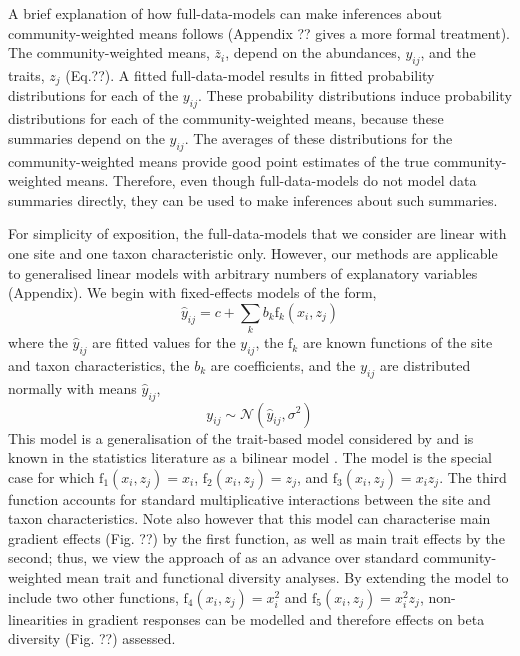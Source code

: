 \documentclass[12pt]{ecology}
\begin{document}
A brief explanation of how full-data-models can make inferences about community-weighted means follows (Appendix ?? gives a more formal treatment).  The community-weighted means, $\bar{z}_i$, depend on the abundances, $y_{ij}$, and the traits, $z_j$ (Eq.??).  A fitted full-data-model results in fitted probability distributions for each of the $y_{ij}$.  These probability distributions induce probability distributions for each of the community-weighted means, because these summaries depend on the $y_{ij}$.  The averages of these distributions for the community-weighted means provide good point estimates of the true community-weighted means.  Therefore, even though full-data-models do not model data summaries directly, they can be used to make inferences about such summaries.


For simplicity of exposition, the full-data-models that we consider are linear with one site and one taxon characteristic only.  However, our methods are applicable to generalised linear models with arbitrary numbers of explanatory variables (Appendix).  We begin with fixed-effects models of the form,
\begin{equation}
\hat{y}_{ij} = c + 
	\sum_k b_k \mathrm{f}_k (x_i, z_j)
\end{equation}
where the $\hat{y}_{ij}$ are fitted values for the $y_{ij}$, the $\mathrm{f}_k$ are known functions of the site and taxon characteristics, the $b_k$ are coefficients, and the $y_{ij}$ are distributed normally with means $\hat{y}_{ij}$,
\begin{equation}
y_{ij} \sim \mathcal{N}(\hat{y}_{ij},\sigma^2)
\end{equation}
This model is a generalisation of the trait-based model considered by \citet{CormontEtAl2011} and is known in the statistics literature as a bilinear model \citep{Gabriel1998}.  The \citet{CormontEtAl2011} model is the special case for which $\mathrm{f}_1(x_i, z_j) = x_i$, $\mathrm{f}_2(x_i, z_j) = z_j$, and $\mathrm{f}_3(x_i, z_j) = x_i z_j$.  The third function accounts for standard multiplicative interactions between the site and taxon characteristics.  Note also however that this model can characterise main gradient effects (Fig. ??) by the first function, as well as main trait effects by the second; thus, we view the approach of \citet{CormontEtAl2011} as an advance over standard community-weighted mean trait and functional diversity analyses.  By extending the model to include two other functions, $\mathrm{f}_4(x_i, z_j) = x_i^2$ and $\mathrm{f}_5(x_i, z_j) = x_i^2 z_j$, non-linearities in gradient responses can be modelled and therefore effects on beta diversity (Fig. ??) assessed.
\end{document}
